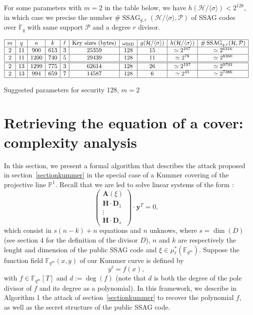 \documentclass[10pt]{article}
\theoremstyle{definition}
\theoremstyle{definition}
\theoremstyle{definition}
\newcommand{\cd}{\cdot}
\newcommand{\PP}{\mathbb{P}}
\newcommand{\calH}{\mathcal{H}}
\newcommand{\Fqm}{\mathbb{F}_{q^m}}
\newcommand{\Fq}{\mathbb{F}_q}
\newcommand{\w}{\omega}
\newcommand{\PR}{\mathcal{P}}
\newcommand{\ssag}{\operatorname{SSAG}}
\begin{document}
For some parameters with $m=2$ in the table below, we have $h(\calH/\langle \sigma \rangle) < 2^{128}$, in which case we precise the number $\#\ssag_{q,r}(\calH/\langle \sigma \rangle,\PR)$ of SSAG codes over $\Fq$ with same support $\PR$ and a degree $r$ divisor.

\begin{table}[htbp]
\begin{equation*}
\begin{array}{|c|c|c|c|c|c|c|c|c|c|}
\hline
m & q  & n & k & \ell &\mathrm{Key} \ \mathrm{sizes} \ (\mathrm{bytes}) & \w_{\mathrm{ISD}} & g(\calH/\langle \sigma \rangle) & h(\calH/\langle \sigma \rangle) & \#\ssag_{q,r}(\mathcal{H},\PR)  \\
\hline
2 & 11  & 900 & 613 & 3 & 25359 & 128 & 15 & \simeq 2^{107} & \simeq 2^{6316} \\
\hline
2 & 11  & 1200 & 740 & 5 & 29439 & 128 & 11 & \simeq 2^{78} & \simeq 2^{8360}\\
\hline \hline
2 & 13  & 1299 & 775 & 3 & 62614 & 128 & 26 & \simeq 2^{197} & \simeq 2^{9793}\\
\hline
2 & 13 & 994 & 659 & 7 & 14587 & 128 & 6 & \simeq 2^{45} & \simeq 2^{7386}\\
\hline
\end{array}
\end{equation*}
\caption{Suggested parameters for security 128, $m = 2$}
\end{table}

\newpage


\appendix


\section{Retrieving the equation of a cover: complexity analysis} \label{annexA}


In this section, we present a formal algorithm that describes the attack proposed in section~\ref{sectionkummer} in the special case of a Kummer covering of the projective line $\PP^1$. Recall that we are led to solve linear systems of the form :
\begin{equation} \tag{$\Delta(\xi)$}
\begin{pmatrix}
\mathbf{A}(\xi) \\
\mathbf{H} \cd \textbf{D}_1 \\
\vdots \\
\mathbf{H} \cd \textbf{D}_s
\end{pmatrix}
\cd \textbf{y}^T = 0,
\end{equation}
which consist in $s(n-k)+n$ equations and $n$ unknows, where $s=\dim(D)$ (see section 4 for the definition of the divisor $D$), $n$ and $k$ are respectively the lenght and dimension of the public SSAG code and $\xi \in \mu_{\ell}^*(\Fqm)$. Suppose the function field $\Fqm(x,y)$ of our Kummer curve is defined by
\[y^{\ell} = f(x),\]
with $f \in \Fqm[T]$ and $d:=\deg(f)$ (note that $d$ is both the degree of the pole divisor of $f$ and its degree as a polynomial). In this framework, we describe in Algorithm 1 the attack of section~\ref{sectionkummer} to recover the polynomial $f$, as well as the secret structure of the public SSAG code.
\end{document}
